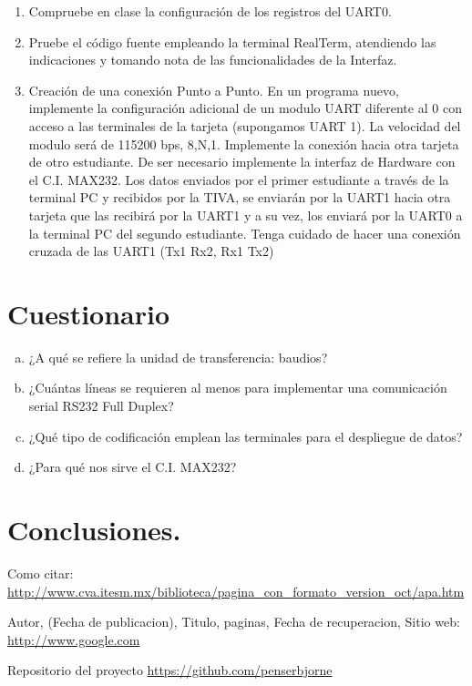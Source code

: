 \documentclass[a4paper,11pt]{article}                 %
\begin{document}
\begin{enumerate}
	\item Compruebe en clase la configuración de los registros del UART0. 
	\item Pruebe el código fuente empleando la terminal RealTerm, atendiendo las indicaciones y tomando nota de las funcionalidades de la Interfaz. 
	\item  Creación de una conexión Punto a Punto. En un programa nuevo, implemente la configuración adicional de un modulo UART diferente al 0 con acceso a las 
	terminales de la tarjeta (supongamos UART 1). La velocidad del modulo será de 115200 bps, 8,N,1. Implemente la conexión hacia otra tarjeta de otro estudiante. De ser necesario implemente la interfaz de Hardware con el C.I. MAX232. Los datos enviados por el primer estudiante a través de la terminal PC y recibidos por la TIVA, se enviarán por la UART1 hacia otra tarjeta que las recibirá por la UART1 y a su vez, los enviará por la UART0 a la terminal PC del segundo estudiante. Tenga cuidado de hacer una conexión cruzada de las UART1 (Tx1 Rx2, Rx1 Tx2) 
	
\end{enumerate} 



 
  \section{Cuestionario}
   
  
  \begin{enumerate}[a)]

  	\item ¿A qué se refiere la unidad de transferencia: baudios?
  	\item  ¿Cuántas líneas se requieren al menos para implementar una comunicación serial RS232 Full Duplex?
  	\item  ¿Qué tipo de codificación emplean las terminales para el despliegue de datos? 
  	\item ¿Para qué nos sirve el C.I. MAX232? 
  	  
  \end{enumerate}




\section{Conclusiones.}
  \begin{thebibliography}{}                           %
      Como citar: \url{http://www.cva.itesm.mx/biblioteca/pagina_con_formato_version_oct/apa.htm} %

      Autor,
      (Fecha de publicacion),
      Titulo, paginas,
      Fecha de recuperacion,
      Sitio web: \url{http://www.google.com}

      Repositorio del proyecto \url{https://github.com/penserbjorne}
  \end{thebibliography}

\end{document}
